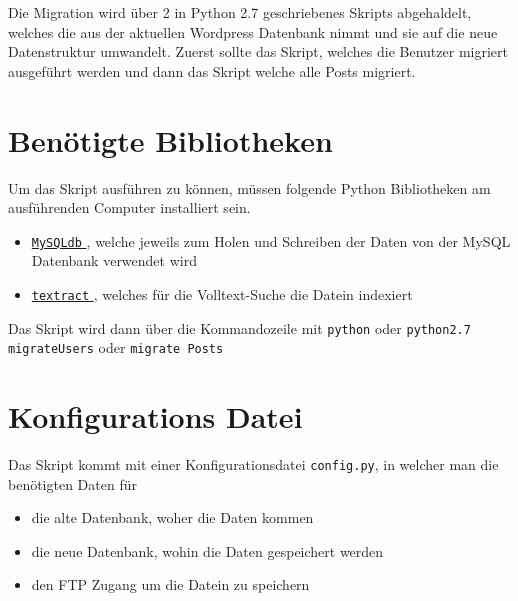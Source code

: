 Die Migration wird \"uber 2 in Python 2.7 geschriebenes Skripts abgehaldelt, welches die aus der aktuellen Wordpress Datenbank nimmt und sie auf die neue Datenstruktur umwandelt.
Zuerst sollte das Skript, welches die Benutzer migriert ausgef\"uhrt werden und dann das Skript welche alle Posts migriert.

\section{Ben\"otigte Bibliotheken}
Um das Skript ausf\"uhren zu k\"onnen, m\"ussen folgende Python Bibliotheken am ausf\"uhrenden Computer installiert sein.

\begin{itemize}
  \item \href{http://mysql-python.sourceforge.net/MySQLdb.html}{ \texttt{MySQLdb} }, welche jeweils zum Holen und Schreiben der Daten von der MySQL Datenbank verwendet wird
  \item \href{https://textract.readthedocs.io/en/latest/}{ \texttt{textract} }, welches f\"ur die Volltext-Suche die Datein indexiert
\end{itemize}

Das Skript wird dann \"uber die Kommandozeile mit \texttt{python} oder \texttt{python2.7 migrateUsers} oder \texttt{migrate Posts}

\section{Konfigurations Datei}
Das Skript kommt mit einer Konfigurationsdatei \texttt{config.py}, in welcher man die ben\"otigten Daten f\"ur

\begin{itemize}
  \item die alte Datenbank, woher die Daten kommen
  \item die neue Datenbank, wohin die Daten gespeichert werden
  \item den FTP Zugang um die Datein zu speichern\\
\end{itemize}

